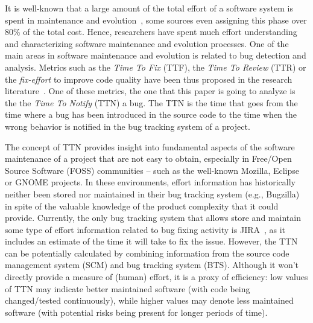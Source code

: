 \documentclass[10pt, conference]{IEEEtran}
\begin{document}
It is well-known that a large amount of the total effort of a software system is spent in maintenance and evolution~\cite{tassey2002economic}, some sources even assigning this phase over 80\% of the total cost. Hence, researchers have spent much effort understanding and characterizing software maintenance and evolution processes. One of the main areas in software maintenance and evolution is related to bug detection and analysis. Metrics such as the \emph{Time To Fix} (TTF), the \emph{Time To Review} (TTR) or the \emph{fix-effort} to improve code quality have been thus proposed in the research literature~\cite{kim2006long}\cite{mockus2002two}. One of these metrics, the one that this paper is going to analyze is the the \emph{Time To Notify} (TTN) a bug. The TTN is the time that goes from the time where a bug has been introduced in the source code to the time when the wrong behavior is notified in the bug tracking system of a project. 

The concept of TTN provides insight into fundamental aspects of the software maintenance of a project that are not easy to obtain, especially in Free/Open Source Software (FOSS) communities -- such as the well-known Mozilla, Eclipse or GNOME projects. In these environments, effort information has historically neither been stored nor maintained in their bug tracking system (e.g., Bugzilla) in spite of the valuable knowledge of the product complexity that it  could provide. Currently, the only bug tracking system that allows store and maintain some type of effort information related to bug fixing activity is JIRA~\cite{weiss2007long}, as it includes an estimate of the time it will take to fix the issue. However, the TTN can be potentially calculated by combining information from the source code management system (SCM) and bug tracking system (BTS). Although it won't directly provide a measure of (human) effort, it is a proxy of efficiency: low values of TTN may indicate better maintained software (with code being changed/tested continuously), while higher values may denote less maintained software (with potential risks being present for longer periods of time).
\end{document}
